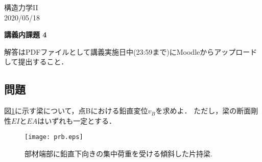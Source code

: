 \documentclass[10pt,a4j]{jarticle}
\newlength{\minitwocolumn}
\begin{document}
\newcommand{\fat}[1]{\mbox{\boldmath $#1$}}
\newcommand{\D}{\partial}
\newcommand{\w}{\omega}
\newcommand{\ga}{\alpha}
\newcommand{\gb}{\beta}
\newcommand{\gx}{\xi}
\newcommand{\gz}{\zeta}
\newcommand{\vhat}[1]{\hat{\fat{#1}}}
\newcommand{\spc}{\vspace{0.7\baselineskip}}
\newcommand{\halfspc}{\vspace{0.3\baselineskip}}

\newcommand{\twofig}[2]
 {
   \begin{figure}
     \begin{minipage}[t]{\minitwocolumn}
         \begin{center}   #1
         \end{center}
     \end{minipage}
         \hspace{\columnsep}
     \begin{minipage}[t]{\minitwocolumn}
         \begin{center} #2
         \end{center}
     \end{minipage}
   \end{figure}
 }
\begin{flushright}
	構造力学II\\
	 2020/05/18
\end{flushright}
\begin{center}
	{\LARGE	\bf 講義内課題 4} 
\end{center}
\vspace{10mm}
解答はPDFファイルとして講義実施日中(23:59まで)にMoodleからアップロードして提出すること．
\subsection*{問題}
図\ref{fig:prb}に示す梁について，点Bにおける鉛直変位$v_B$を求めよ．
ただし，梁の断面剛性$EI$と$EA$はいずれも一定とする．
\begin{figure}[h]
	\begin{center}
	\texttt{[image: prb.eps]} 
	\end{center}
	\caption{部材端部に鉛直下向きの集中荷重を受ける傾斜した片持梁.} 
	\label{fig:prb}
\end{figure}
\end{document}

